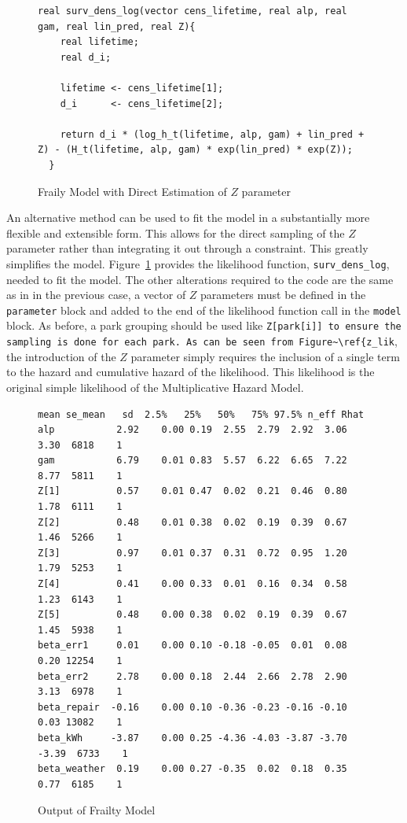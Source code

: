 \begin{figure}[htbp]
    \centering
    \begin{lstlisting}[belowskip=-2 \baselineskip]
  real surv_dens_log(vector cens_lifetime, real alp, real gam, real lin_pred, real Z){
    real lifetime;
    real d_i;
  
    lifetime <- cens_lifetime[1];
    d_i      <- cens_lifetime[2];
  
    return d_i * (log_h_t(lifetime, alp, gam) + lin_pred + Z) - (H_t(lifetime, alp, gam) * exp(lin_pred) * exp(Z));
  }\end{lstlisting}
    \caption{Fraily Model with Direct Estimation of $Z$ parameter}
    \label{z_lik}
\end{figure}


An alternative method can be used to fit the model in a substantially more flexible and extensible form. This allows for the direct sampling of the $Z$ parameter rather than integrating it out through a constraint. This greatly simplifies the model. Figure~\ref{z_lik} provides the likelihood function, \lstinline{surv_dens_log}, needed to fit the model. The other alterations required to the code are the same as in in the previous case, a vector of $Z$ parameters must be defined in the \lstinline{parameter} block and added to the end of the likelihood function call in the \lstinline{model} block. As before, a park grouping should be used like \lstinline{Z[park[i]] to ensure the sampling is done for each park. As can be seen from Figure~\ref{z_lik}, the introduction of the $Z$ parameter simply requires the inclusion of a single term to the hazard and cumulative hazard of the likelihood. This likelihood is the original simple likelihood of the Multiplicative Hazard Model. 

\begin{figure}[htbp]
    \centering
    \begin{lstlisting}[belowskip=-2 \baselineskip]
              mean se_mean   sd  2.5%   25%   50%   75% 97.5% n_eff Rhat
alp           2.92    0.00 0.19  2.55  2.79  2.92  3.06  3.30  6818    1
gam           6.79    0.01 0.83  5.57  6.22  6.65  7.22  8.77  5811    1
Z[1]          0.57    0.01 0.47  0.02  0.21  0.46  0.80  1.78  6111    1
Z[2]          0.48    0.01 0.38  0.02  0.19  0.39  0.67  1.46  5266    1
Z[3]          0.97    0.01 0.37  0.31  0.72  0.95  1.20  1.79  5253    1
Z[4]          0.41    0.00 0.33  0.01  0.16  0.34  0.58  1.23  6143    1
Z[5]          0.48    0.00 0.38  0.02  0.19  0.39  0.67  1.45  5938    1
beta_err1     0.01    0.00 0.10 -0.18 -0.05  0.01  0.08  0.20 12254    1
beta_err2     2.78    0.00 0.18  2.44  2.66  2.78  2.90  3.13  6978    1
beta_repair  -0.16    0.00 0.10 -0.36 -0.23 -0.16 -0.10  0.03 13082    1
beta_kWh     -3.87    0.00 0.25 -4.36 -4.03 -3.87 -3.70 -3.39  6733    1
beta_weather  0.19    0.00 0.27 -0.35  0.02  0.18  0.35  0.77  6185    1\end{lstlisting}
    \caption{Output of Frailty Model}
    \label{out_frail}
\end{figure}

